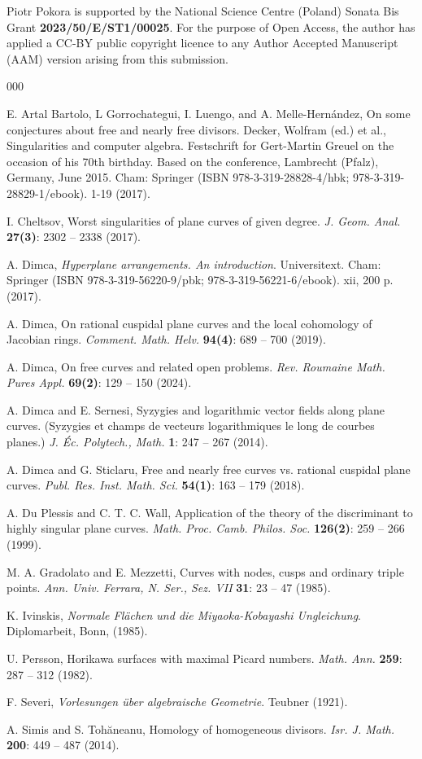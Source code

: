 \documentclass[12pt]{article}
\theoremstyle{plain}
\theoremstyle{definition}
\begin{document}
Piotr Pokora is supported by the National Science Centre (Poland) Sonata Bis Grant  \textbf{2023/50/E/ST1/00025}. For the purpose of Open Access, the author has applied a CC-BY public copyright licence to any Author Accepted Manuscript (AAM) version arising from this submission.
\begin{thebibliography}{000}

E. Artal Bartolo, L Gorrochategui, I. Luengo, and A. Melle-Hern\'andez, On some conjectures about free and nearly free divisors. Decker, Wolfram (ed.) et al., Singularities and computer algebra. Festschrift for Gert-Martin Greuel on the occasion of his 70th birthday. Based on the conference, Lambrecht (Pfalz), Germany, June 2015. Cham: Springer (ISBN 978-3-319-28828-4/hbk; 978-3-319-28829-1/ebook). 1-19 (2017).

I. Cheltsov, Worst singularities of plane curves of given degree. 
\textit{J. Geom. Anal.} \textbf{27(3)}: 2302 -- 2338 (2017).

A. Dimca,  \textit{Hyperplane arrangements. An introduction}. Universitext. Cham: Springer (ISBN 978-3-319-56220-9/pbk; 978-3-319-56221-6/ebook). xii, 200 p. (2017).

A. Dimca, On rational cuspidal plane curves and the local cohomology of Jacobian rings.
\textit{Comment. Math. Helv.} \textbf{94(4)}: 689 -- 700 (2019).

A. Dimca, On free curves and related open problems. \textit{Rev. Roumaine Math. Pures Appl.} \textbf{69(2)}: 129 -- 150 (2024).

A. Dimca and E. Sernesi, Syzygies and logarithmic vector fields along plane curves. (Syzygies et champs de vecteurs logarithmiques le long de courbes planes.) \textit{J. Éc. Polytech., Math.} \textbf{1}: 247 -- 267 (2014).

A. Dimca and G. Sticlaru, Free and nearly free curves vs. rational cuspidal plane curves. \textit{Publ. Res. Inst. Math. Sci.} \textbf{54(1)}: 163 -- 179 (2018).

A. Du Plessis and C. T. C. Wall, Application of the theory of the discriminant to highly singular plane curves. \textit{Math. Proc. Camb. Philos. Soc.} \textbf{126(2)}: 259 -- 266 (1999).

M. A. Gradolato and E.  Mezzetti, Curves with nodes, cusps and ordinary triple points. \textit{Ann. Univ. Ferrara, N. Ser., Sez. VII} \textbf{31}: 23 -- 47 (1985).

K. Ivinskis, \textit{Normale Fl\"{a}chen und die Miyaoka-Kobayashi Ungleichung}. Diplomarbeit, Bonn, (1985).

U. Persson, Horikawa surfaces with maximal Picard numbers. \textit{Math. Ann.} \textbf{259}: 287 -- 312 (1982).
 
F. Severi, \textit{Vorlesungen \"uber algebraische Geometrie}. Teubner (1921).

A. Simis and S. Tohăneanu, 
Homology of homogeneous divisors. \textit{Isr. J. Math.} \textbf{200}: 449 -- 487 (2014).

\end{thebibliography}
\end{document}

